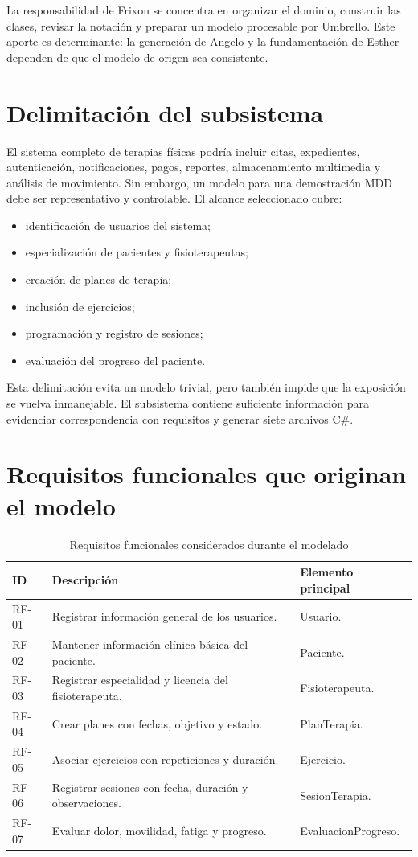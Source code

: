 La responsabilidad de Frixon se concentra en organizar el dominio, construir las clases, revisar la notación y preparar un modelo procesable por Umbrello. Este aporte es determinante: la generación de Angelo y la fundamentación de Esther dependen de que el modelo de origen sea consistente.

\section{Delimitación del subsistema}
El sistema completo de terapias físicas podría incluir citas, expedientes, autenticación, notificaciones, pagos, reportes, almacenamiento multimedia y análisis de movimiento. Sin embargo, un modelo para una demostración MDD debe ser representativo y controlable. El alcance seleccionado cubre:
\begin{itemize}
  \item identificación de usuarios del sistema;
  \item especialización de pacientes y fisioterapeutas;
  \item creación de planes de terapia;
  \item inclusión de ejercicios;
  \item programación y registro de sesiones;
  \item evaluación del progreso del paciente.
\end{itemize}

Esta delimitación evita un modelo trivial, pero también impide que la exposición se vuelva inmanejable. El subsistema contiene suficiente información para evidenciar correspondencia con requisitos y generar siete archivos C\#.

\section{Requisitos funcionales que originan el modelo}
\begin{table}[H]
\centering
\caption{Requisitos funcionales considerados durante el modelado}
\begin{tabularx}{\textwidth}{L{2cm}X L{4.5cm}}
\toprule
\textbf{ID} & \textbf{Descripción} & \textbf{Elemento principal} \\
\midrule
RF-01 & Registrar información general de los usuarios. & Usuario. \\
RF-02 & Mantener información clínica básica del paciente. & Paciente. \\
RF-03 & Registrar especialidad y licencia del fisioterapeuta. & Fisioterapeuta. \\
RF-04 & Crear planes con fechas, objetivo y estado. & PlanTerapia. \\
RF-05 & Asociar ejercicios con repeticiones y duración. & Ejercicio. \\
RF-06 & Registrar sesiones con fecha, duración y observaciones. & SesionTerapia. \\
RF-07 & Evaluar dolor, movilidad, fatiga y progreso. & EvaluacionProgreso. \\
\bottomrule
\end{tabularx}
\end{table}


